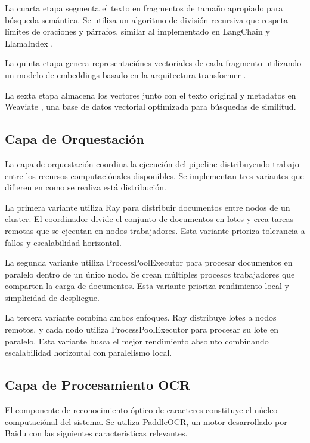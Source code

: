 \documentclass[12pt,a4paper,twoside]{book}
\begin{document}
La cuarta etapa segmenta el texto en fragmentos de tamaño apropiado para búsqueda semántica. Se utiliza un algoritmo de división recursiva que respeta límites de oraciones y párrafos, similar al implementado en LangChain \cite{langchain2023} y LlamaIndex \cite{llamaindex2023}.

La quinta etapa genera representaciónes vectoriales de cada fragmento utilizando un modelo de embeddings basado en la arquitectura transformer \cite{vaswani2017attention, devlin2019bert}.

La sexta etapa almacena los vectores junto con el texto original y metadatos en Weaviate \cite{weaviate2023}, una base de datos vectorial optimizada para búsquedas de similitud.

\subsection{Capa de Orquestación}

La capa de orquestación coordina la ejecución del pipeline distribuyendo trabajo entre los recursos computaciónales disponibles. Se implementan tres variantes que difieren en como se realiza está distribución.

La primera variante utiliza Ray para distribuir documentos entre nodos de un cluster. El coordinador divide el conjunto de documentos en lotes y crea tareas remotas que se ejecutan en nodos trabajadores. Esta variante prioriza tolerancia a fallos y escalabilidad horizontal.

La segunda variante utiliza ProcessPoolExecutor para procesar documentos en paralelo dentro de un único nodo. Se crean múltiples procesos trabajadores que comparten la carga de documentos. Esta variante prioriza rendimiento local y simplicidad de despliegue.

La tercera variante combina ambos enfoques. Ray distribuye lotes a nodos remotos, y cada nodo utiliza ProcessPoolExecutor para procesar su lote en paralelo. Esta variante busca el mejor rendimiento absoluto combinando escalabilidad horizontal con paralelismo local.

\subsection{Capa de Procesamiento OCR}

El componente de reconocimiento óptico de caracteres constituye el núcleo computaciónal del sistema. Se utiliza PaddleOCR, un motor desarrollado por Baidu con las siguientes caracteristicas relevantes.
\end{document}
